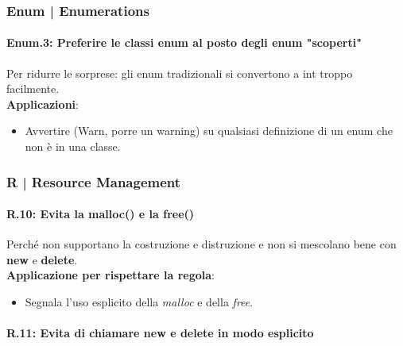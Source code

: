 
\subsubsection{Enum | Enumerations}

\paragraph{Enum.3: Preferire le classi enum al posto degli enum "scoperti"} %

\textsf{\small Per ridurre le sorprese: gli enum tradizionali si convertono a int troppo facilmente.} \\

\textsf{\small \textbf{Applicazioni}: }

\begin{itemize}
	\item \textsf{\small Avvertire (Warn, porre un warning) su qualsiasi definizione di un enum che non è in una classe.}
\end{itemize}


\subsubsection{R | Resource Management}

\paragraph{R.10: Evita la malloc() e la free()}

\textsf{\small Perché non supportano la costruzione e distruzione e non si mescolano bene con \textbf{new} e \textbf{delete}.} \\

\textsf{\small \textbf{Applicazione per rispettare la regola}: }

\begin{itemize}
	\item \textsf{\small Segnala l'uso esplicito della \emph{malloc} e della \emph{free}.}
\end{itemize}

\paragraph{R.11: Evita di chiamare \textbf{new} e \textbf{delete} in modo esplicito}

